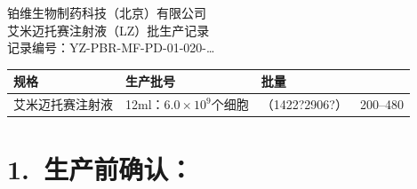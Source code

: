 \documentclass[UTF8,10pt,a4paper,fontset=fandol]{ctexart}
\newcommand{\fieldvalue}[1]{#1}
\newcommand{\handwritten}[1]{#1}
\begin{document}
\newpage

\begin{center}
{\small 铂维生物制药科技（北京）有限公司}\\
{\Large 艾米迈托赛注射液（LZ）批生产记录}\\
记录编号：YZ-PBR-MF-PD-01-020-\ldots
\end{center}

\begin{center}
\begin{tabularx}{\textwidth}{|>{\centering\arraybackslash}X|>{\centering\arraybackslash}X|>{\centering\arraybackslash}X|>{\centering\arraybackslash}X|}
\hline
规格 & 生产批号 & 批量\\
\hline
艾米迈托赛注射液 &
12ml：$6.0\times 10^{9}$个细胞 &
\fieldvalue{\handwritten{（1422?2906?）}} &
\fieldvalue{\handwritten{200--480}}\\
\hline
\end{tabularx}
\end{center}

\section*{1.\ 生产前确认：}
\end{document}
